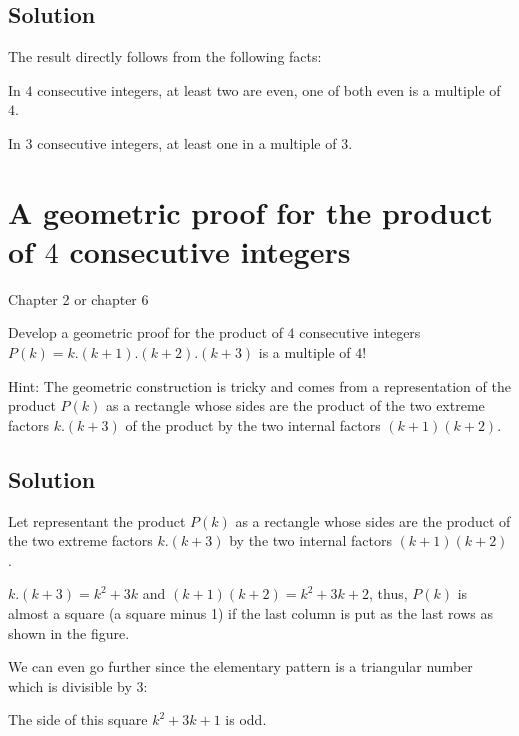 \documentclass{article}[12pt]
\begin{document}
\subsection{Solution}

The result directly follows from the following facts:

In $4$ consecutive integers, at least two are even, one of both even is a multiple of $4$.

In $3$ consecutive integers, at least one in a multiple of $3$.


\section{A geometric proof for the product of $4$ consecutive integers}

Chapter 2 or chapter 6

Develop a geometric proof for the product of $4$ consecutive integers $P(k) = k.(k+1).(k+2).(k+3)$
is a multiple of $4!$

Hint:
The geometric construction is tricky and comes from a representation of the product $P(k)$ as a rectangle whose sides are the product of the two extreme factors 
$k.(k+3)$ of the product by the two internal factors $(k+1)(k+2)$.

\subsection{Solution}
Let representant the product $P(k)$ as a rectangle whose sides are the product of the two extreme factors 
$k.(k+3)$ by the two internal factors $(k+1)(k+2)$.

$k.(k+3) = k^2 + 3k$ and $(k+1)(k+2) = k^2 + 3k +2$, thus, $P(k)$ is almost a square (a square minus 1)
if the last column is put as the last rows as shown in the figure.

We can even go further since the elementary pattern is a triangular number which is divisible by $3$:

The side of this square $k^2+3k+1$ is odd. 
\end{document}
